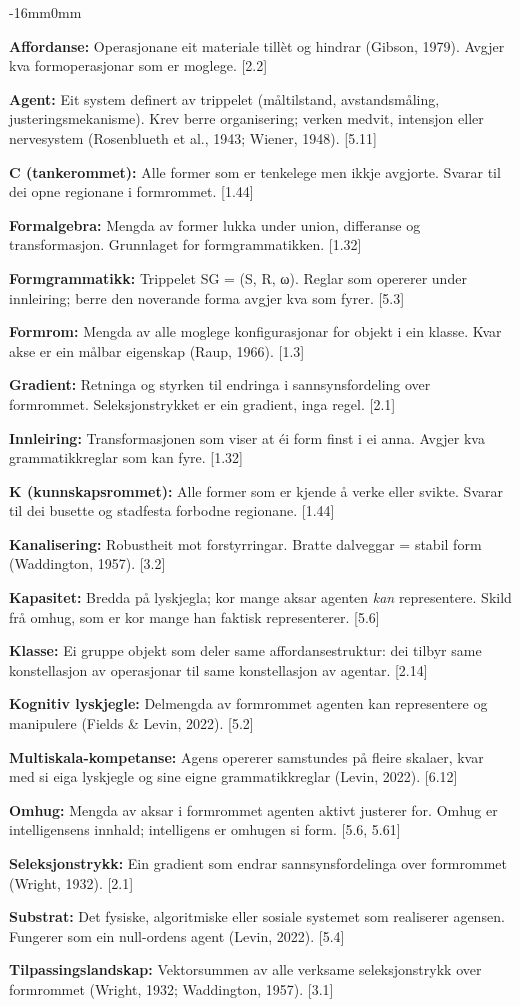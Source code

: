 \documentclass[10pt,oneside]{book}
\newcommand{\msym}[1]{{\mathfbfont #1}}
\newcommand{\silentchapter}[2]{%
  \clearpage
  \markboth{#2}{}%
  \addcontentsline{toc}{chapter}{#1}%
}
\newenvironment{ordliste}{%
  \begingroup\footnotesize\setlength{\parskip}{0.3pt plus 0.1pt}%
  \linespread{0.92}\selectfont
}{%
  \endgroup
}
\newcommand{\ordlisteentry}[2]{%
  \par\addvspace{1.5pt}%
  \noindent\textbf{#1:} #2\par%
}
\newenvironment{widebody}{%
  \begin{adjustwidth}{-16mm}{0mm}%
}{%
  \end{adjustwidth}%
}
\begin{document}
\silentchapter{Ordliste}{ordliste}
\begin{widebody}
\begin{ordliste}
\ordlisteentry{Affordanse}{Operasjonane eit materiale tillèt og hindrar (Gibson, 1979). Avgjer kva formoperasjonar som er moglege. [2.2]}
\ordlisteentry{Agent}{Eit system definert av trippelet (måltilstand, avstandsmåling, justeringsmekanisme). Krev berre organisering; verken medvit, intensjon eller nervesystem (Rosenblueth et al., 1943; Wiener, 1948). [5.11]}
\ordlisteentry{C (tankerommet)}{Alle former som er tenkelege men ikkje avgjorte. Svarar til dei opne regionane i formrommet. [1.44]}
\ordlisteentry{Formalgebra}{Mengda av former lukka under union, differanse og transformasjon. Grunnlaget for formgrammatikken. [1.32]}
\ordlisteentry{Formgrammatikk}{Trippelet SG = (S, R, \msym{ω}). Reglar som opererer under innleiring; berre den noverande forma avgjer kva som fyrer. [5.3]}
\ordlisteentry{Formrom}{Mengda av alle moglege konfigurasjonar for objekt i ein klasse. Kvar akse er ein målbar eigenskap (Raup, 1966). [1.3]}
\ordlisteentry{Gradient}{Retninga og styrken til endringa i sannsynsfordeling over formrommet. Seleksjonstrykket er ein gradient, inga regel. [2.1]}
\ordlisteentry{Innleiring}{Transformasjonen som viser at éi form finst i ei anna. Avgjer kva grammatikkreglar som kan fyre. [1.32]}
\ordlisteentry{K (kunnskapsrommet)}{Alle former som er kjende å verke eller svikte. Svarar til dei busette og stadfesta forbodne regionane. [1.44]}
\ordlisteentry{Kanalisering}{Robustheit mot forstyrringar. Bratte dalveggar = stabil form (Waddington, 1957). [3.2]}
\ordlisteentry{Kapasitet}{Bredda på lyskjegla; kor mange aksar agenten \textit{kan} representere. Skild frå omhug, som er kor mange han faktisk representerer. [5.6]}
\ordlisteentry{Klasse}{Ei gruppe objekt som deler same affordansestruktur: dei tilbyr same konstellasjon av operasjonar til same konstellasjon av agentar. [2.14]}
\ordlisteentry{Kognitiv lyskjegle}{Delmengda av formrommet agenten kan representere og manipulere (Fields \& Levin, 2022). [5.2]}
\ordlisteentry{Multiskala-kompetanse}{Agens opererer samstundes på fleire skalaer, kvar med si eiga lyskjegle og sine eigne grammatikkreglar (Levin, 2022). [6.12]}
\ordlisteentry{Omhug}{Mengda av aksar i formrommet agenten aktivt justerer for. Omhug er intelligensens innhald; intelligens er omhugen si form. [5.6, 5.61]}
\ordlisteentry{Seleksjonstrykk}{Ein gradient som endrar sannsynsfordelinga over formrommet (Wright, 1932). [2.1]}
\ordlisteentry{Substrat}{Det fysiske, algoritmiske eller sosiale systemet som realiserer agensen. Fungerer som ein null-ordens agent (Levin, 2022). [5.4]}
\ordlisteentry{Tilpassingslandskap}{Vektorsummen av alle verksame seleksjonstrykk over formrommet (Wright, 1932; Waddington, 1957). [3.1]}
\end{ordliste}
\end{widebody}
\end{document}
